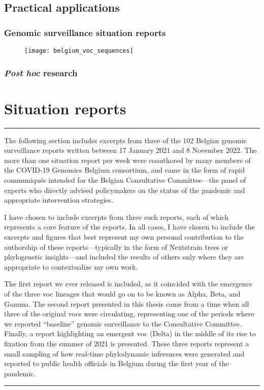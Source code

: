 \subsection{Practical applications}

\subsubsection{Genomic surveillance situation reports}

\begin{figure}[ht]
  \centering
  \texttt{[image: belgium\_voc\_sequences]}
  \caption[VOC sequences in Belgium]{}
  \label{fig:beVoc}
\end{figure}

\subsubsection{\textit{Post hoc} research}

\section{Situation reports}\label{sec:sitRep}
\singlespacing
\hrule
\vspace*{12pt}
The following section includes excerpts from three of the 102 Belgian genomic surveillance reports written between 17 January 2021 and 8 November 2022.
The more than one situation report per week were coauthored by many members of the COVID-19 Genomics Belgium consortium, and came in the form of rapid communiqu\'{e}s intended for the Belgian Consultative Committee---the panel of experts who directly advised policymakers on the status of the pandemic and appropriate intervention strategies.

I have chosen to include excerpts from three such reports, each of which represents a core feature of the reports.
In all cases, I have chosen to include the excerpts and figures that best represent my own personal contribution to the authorship of these reports---typically in the form of Nextstrain trees or phylogenetic insights---and included the results of others only where they are appropriate to contextualize my own work.

The first report we ever released is included, as it coincided with the emergence of the three \gls{voc} lineages that would go on to be known as Alpha, Beta, and Gamma.
The second report presented in this thesis came from a time when all three of the original \gls{voc}s were circulating, representing one of the periods where we reported ``baseline'' genomic surveillance to the Consultative Committee.
Finally, a report highlighting an emergent \gls{voc} (Delta) in the middle of its rise to fixation from the summer of 2021 is presented.
These three reports represent a small sampling of how real-time phylodynamic inferences were generated and reported to public health officials in Belgium during the first year of the pandemic.
\vspace*{12pt}
\hrule
\onehalfspacing

